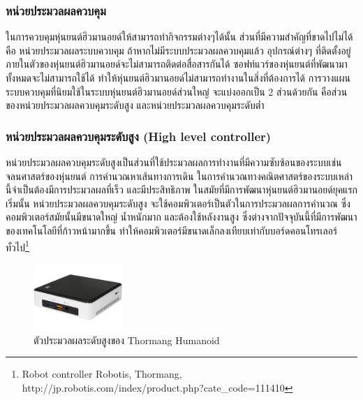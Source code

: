 \clearpage
\subsubsection*{หน่วยประมวลผลควบคุม}
ในการควบคุมหุ่นยนต์ฮิวมานอยด์ให้สามารถทำกิจกรรมต่างๆได้นั้น ส่วนที่มีความสำคัญที่ขาดไปไม่ได้ คือ
หน่วยประมวลผลระบบควบคุม ถ้าหากไม่มีระบบประมวลผลควบคุมแล้ว อุปกรณ์ต่างๆ ที่ติดตั้งอยู่ภายในตัวของหุ่นยนต์ฮิวมานอยด์จะไม่สามารถติดต่อสื่อสารกันได้
ซอฟท์แวร์ของหุ่นยนต์ที่พัฒนามาทั้งหมดจะไม่สามารถใช้ได้ ทำให้หุ่นยนต์ฮิวมานอยด์ไม่สามารถทำงานในสิ่งที่ต้องการได้ 
การวางแผนระบบควบคุมที่นิยมใช้ในระบบหุ่นยนต์ฮิวมานอยด์ส่วนใหญ่ จะแบ่งออกเป็น 2 ส่วนด้วยกัน 
คือส่วนของหน่วยประมวลผลควบคุมระดับสูง และหน่วยประมวลผลควบคุมระดับต่ำ

\subsubsection*{หน่วยประมวลผลควบคุมระดับสูง (High level controller)}
หน่วยประมวลผลควบคุมระดับสูงเป็นส่วนที่ใช้ประมวลผลการทำงานที่มีความซับซ้อนของระบบเช่น
จลนศาสตร์ของหุ่นยนต์ การคำนวณหาเส้นทางการเดิน ในการคำนวณทางคณิตศาสตร์ของระบบเหล่านี้จำเป็นต้องมีการประมวลผลที่เร็ว
และมีประสิทธิภาพ ในสมัยที่มีการพัฒนาหุ่นยนต์ฮิวมานอยด์ยุคแรกเริ่มนั้น หน่วยประมวลผลควบคุมระดับสูง
จะใช้คอมพิวเตอร์เป็นตัวในการประมวลผลการคำนวณ ซึ่งคอมพิวเตอร์สมัยนั้นมีขนาดใหญ่ น้ำหนักมาก
และต้องใช้หลังงานสูง ซึ่งต่างจากปัจจุบันนี้ที่มีการพัฒนาของเทคโนโลยีที่ก้าวหน้ามากขึ้น
ทำให้คอมพิวเตอร์มีขนาดเล็กลงเทียบเท่ากับบอร์ดคอนโทรเลอร์ทั่วไป\footnote{Robot controller Robotis, Thormang, http://jp.robotis.com/index/product.php?cate\_code=111410}

\begin{figure}[!ht]
    \centering
    \includegraphics[width=0.3\textwidth]{chapter2/images/thormang_controller.jpg}
    \caption{ตัวประมวลผลระดับสูงของ Thormang Humanoid}
    \label{fig:thormang_controller}
\end{figure}

